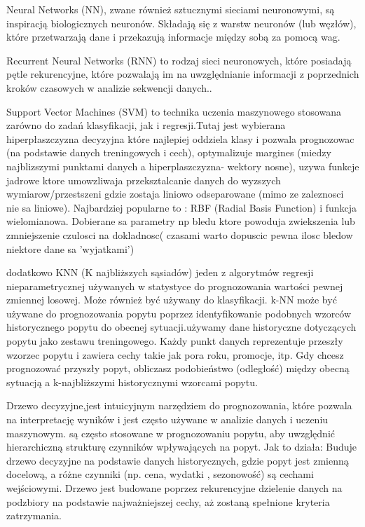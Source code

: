 Neural Networks (NN), zwane również sztucznymi sieciami neuronowymi, są inspiracją biologicznych neuronów. Składają się z warstw neuronów (lub węzłów), które przetwarzają dane i przekazują informacje między sobą za pomocą wag.

Recurrent Neural Networks (RNN) to rodzaj sieci neuronowych, które posiadają pętle rekurencyjne, które pozwalają im na uwzględnianie informacji z poprzednich kroków czasowych w analizie sekwencji danych..

Support Vector Machines (SVM) to technika uczenia maszynowego stosowana zarówno do zadań klasyfikacji, jak i regresji.Tutaj jest wybierana hiperpłaszczyzna decyzyjna które najlepiej oddziela klasy i pozwala prognozowac (na podstawie danych treningowych i cech), optymalizuje margines (miedzy najblizszymi punktami danych a hiperplaszczyzna- wektory nosne), uzywa funkcje jadrowe ktore umowzliwaja przeksztalcanie danych do wyzszych wymiarow/przestszeni gdzie zostaja liniowo odseparowane (mimo ze zaleznosci nie sa liniowe). Najbardziej popularne to :  RBF (Radial Basis Function) i funkcja wielomianowa. Dobierane sa parametry np bledu ktore powoduja zwiekszenia lub zmniejszenie czulosci na dokladnosc( czasami warto dopuscic pewna ilosc bledow niektore dane sa 'wyjatkami')

dodatkowo  KNN (K najbliższych sąsiadów)  jeden z algorytmów regresji nieparametrycznej używanych w statystyce do prognozowania wartości pewnej zmiennej losowej. Może również być używany do klasyfikacji. k-NN może być używane do prognozowania popytu poprzez identyfikowanie podobnych wzorców historycznego popytu do obecnej sytuacji.używamy dane historyczne dotyczących popytu jako zestawu treningowego. Każdy punkt danych reprezentuje przeszły wzorzec popytu i zawiera cechy takie jak pora roku, promocje,  itp. Gdy chcesz prognozować przyszły popyt, obliczasz podobieństwo (odległość) między obecną sytuacją a k-najbliższymi historycznymi wzorcami popytu.

Drzewo decyzyjne,jest intuicyjnym narzędziem do prognozowania, które pozwala na interpretację wyników i jest często używane w analizie danych i uczeniu maszynowym. są często stosowane w prognozowaniu popytu, aby uwzględnić hierarchiczną strukturę czynników wpływających na popyt.
Jak to działa: Buduje drzewo decyzyjne na podstawie danych historycznych, gdzie popyt jest zmienną docelową, a różne czynniki (np. cena, wydatki , sezonowość) są cechami wejściowymi. Drzewo jest budowane poprzez rekurencyjne dzielenie danych na podzbiory na podstawie najważniejszej cechy, aż zostaną spełnione kryteria zatrzymania.

